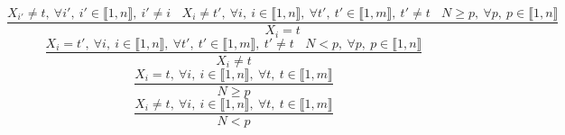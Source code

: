 $$\frac{X_{i'} \neq t,~\forall i',~i' \in \llbracket1,n\rrbracket,~i' \neq i~~~~X_{i} \neq t',~\forall i,~i \in \llbracket1,n\rrbracket,~\forall t',~t' \in \llbracket1,m\rrbracket,~t' \neq t~~~~N \geq p,~\forall p,~p \in \llbracket1,n\rrbracket}{X_{i}=t}$$ $$\frac{X_{i}=t',~\forall i,~i \in \llbracket1,n\rrbracket,~\forall t',~t' \in \llbracket1,m\rrbracket,~t' \neq t~~~~N<p,~\forall p,~p \in \llbracket1,n\rrbracket}{X_{i} \neq t}$$ $$\frac{X_{i}=t,~\forall i,~i \in \llbracket1,n\rrbracket,~\forall t,~t \in \llbracket1,m\rrbracket}{N \geq p}$$ $$\frac{X_{i} \neq t,~\forall i,~i \in \llbracket1,n\rrbracket,~\forall t,~t \in \llbracket1,m\rrbracket}{N<p}$$ 